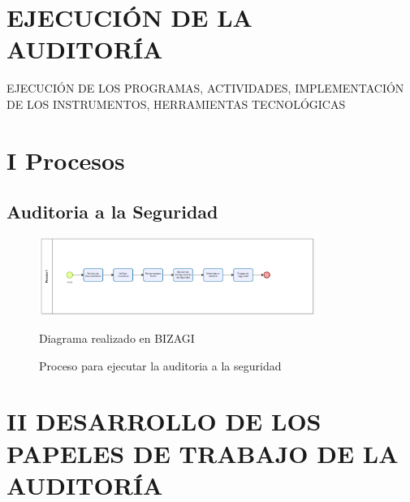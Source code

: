 \documentclass[12pt,a4paper]{article}
\begin{document}
\newpage
\section{EJECUCIÓN DE LA AUDITORÍA}


EJECUCIÓN DE LOS PROGRAMAS, ACTIVIDADES, IMPLEMENTACIÓN DE LOS INSTRUMENTOS,
HERRAMIENTAS TECNOLÓGICAS

\section{I Procesos}
\subsection{Auditoria a la Seguridad}
\begin{figure}[!htb]
    \centering
    \includegraphics[width=0.8\textwidth]{images/proceso1.png}
    \caption{Proceso para ejecutar la auditoria a la seguridad}
    \par Diagrama realizado en BIZAGI
\end{figure}
\FloatBarrier 

\newpage
\section{II DESARROLLO DE LOS PAPELES DE TRABAJO DE LA AUDITORÍA}
\end{document}
